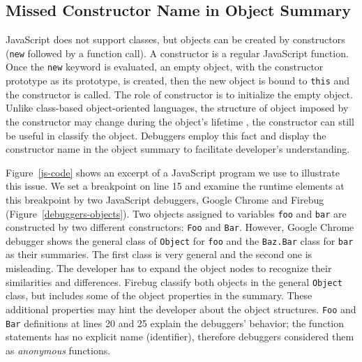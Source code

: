 \documentclass[10pt, preprint]{sigplanconf}
\begin{document}
\subsection{Missed Constructor Name in Object Summary}
JavaScript does not support classes, but objects can be created by constructors ({\small\texttt{new}} followed by a function call). A constructor is a regular JavaScript function. Once the {\small\texttt{new}} keyword is evaluated, an empty object, with the constructor prototype as its prototype, is created, then the new object is bound to {\small\texttt{this}} and the constructor is called. The role of constructor is to initialize the empty object. Unlike class-based object-oriented languages, the structure of object imposed by the constructor may change during the object's lifetime \cite{Richards}, the constructor can still be useful in classify the object.
Debuggers employ this fact and display the constructor name in the object summary to facilitate developer's understanding. 

Figure~\ref{js-code} shows an excerpt of a JavaScript program we use to illustrate this issue. We set a breakpoint on line 15 and examine the runtime elements at this breakpoint by two JavaScript debuggers, Google Chrome and Firebug (Figure~\ref{debuggers-objects}). Two objects assigned to variables {\small\texttt{foo}} and {\small\texttt{bar}} are constructed by two different constructors: {\small\texttt{Foo}} and {\small\texttt{Bar}}. However, Google Chrome debugger shows the general class of {\small\texttt{Object}} for {\small\texttt{foo}} and the {\small\texttt{Baz.Bar}} class for {\small\texttt{bar}} as their summaries. The first class is very general and the second one is misleading. The developer has to expand the object nodes to recognize their similarities and differences. Firebug classify both objects in the general {\small\texttt{Object}} class, but includes some of the object properties in the summary. These additional properties may hint the developer about the object structures. {\small\texttt{Foo}} and {\small\texttt{Bar}} definitions at lines 20 and 25 explain the debuggers' behavior; the function statements has no explicit name (identifier), therefore debuggers considered them as \textit{anonymous} functions. 
\end{document}

